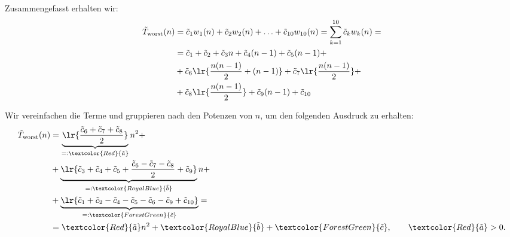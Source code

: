 \begin{frame}
\begin{myanswer}
Zusammengefasst erhalten wir:
{\scriptsize
\begin{align*}
\tilde{T}_{\text{worst}}(n) &= \tilde{c}_1w_1(n) + \tilde{c}_2w_2(n) + \ldots + \tilde{c}_{10}w_{10}(n) = \sum_{k=1}^{10}\tilde{c}_kw_k(n) = \\
&= \tilde{c}_1 + \tilde{c}_2 + \tilde{c}_3n + \tilde{c}_4(n-1) + \tilde{c}_5(n-1) +\\
&+ \tilde{c}_6\lr{\frac{n(n-1)}{2}+(n-1)} + \tilde{c}_7\lr{\frac{n(n-1)}{2}} +\\
&+ \tilde{c}_8\lr{\frac{n(n-1)}{2}} + \tilde{c}_9(n-1) + \tilde{c}_{10}
\end{align*}
}
\end{myanswer}
\end{frame}

\begin{frame}
\begin{myanswer}
{\scriptsize
Wir vereinfachen die Terme und gruppieren nach den Potenzen von $n$, um den folgenden Ausdruck zu erhalten:
\begin{align*}
\tilde{T}_{\text{worst}}(n) &= \underbrace{\lr{\frac{\tilde{c}_6 + \tilde{c}_7 + \tilde{c}_8}{2}}}_{=:\textcolor{Red}{\tilde{a}}} n^2 +\\
&+ \underbrace{\lr{\tilde{c}_3 + \tilde{c}_4 + \tilde{c}_5 + \frac{\tilde{c}_6 - \tilde{c}_7 - \tilde{c}_8}{2} + \tilde{c}_9}}_{=:\textcolor{RoyalBlue}{\tilde{b}}}n +\\
&+ \underbrace{\lr{\tilde{c}_1 + \tilde{c}_2 - \tilde{c}_4 - \tilde{c}_5 - \tilde{c}_6 - \tilde{c}_9 + \tilde{c}_{10}}}_{=:\textcolor{ForestGreen}{\tilde{c}}}=\\
&= \textcolor{Red}{\tilde{a}}n^2 + \textcolor{RoyalBlue}{\tilde{b}} + \textcolor{ForestGreen}{\tilde{c}}, \qquad \textcolor{Red}{\tilde{a}} > 0.
\end{align*}
}
\end{myanswer}
\end{frame}



